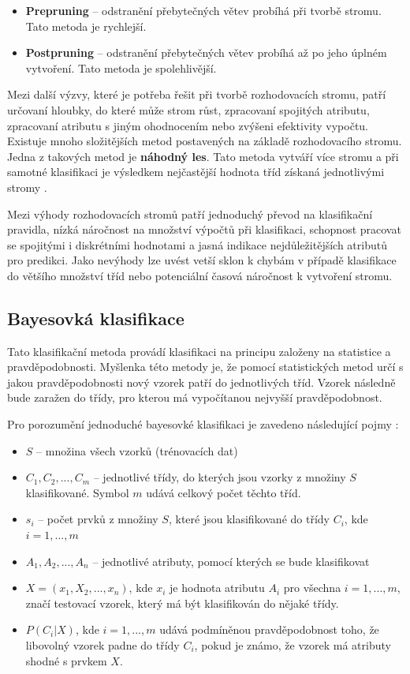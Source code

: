 \begin{itemize}
    \item \textbf{Prepruning} -- odstranění přebytečných větev probíhá při tvorbě stromu. Tato metoda je rychlejší.
    \item \textbf{Postpruning} -- odstranění přebytečných větev probíhá až po jeho úplném vytvoření. Tato metoda je spolehlivější.
\end{itemize}


Mezi další výzvy, které je potřeba řešit při tvorbě rozhodovacích stromu, patří určovaní hloubky, do které může strom růst, zpracovaní spojitých atributu,  zpracovaní atributu s jiným ohodnocením nebo zvýšeni efektivity vypočtu. Existuje mnoho složitějších metod postavených na základě rozhodovacího stromu. Jedna z takových metod je \textbf{náhodný les}. Tato metoda vytváří více stromu a při samotné klasifikaci je výsledkem nejčastější hodnota tříd získaná jednotlivými stromy  \cite{Han}.

Mezi výhody rozhodovacích stromů patří jednoduchý převod na klasifikační pravidla, nízká náročnost na množství výpočtů při klasifikaci, schopnost pracovat se spojitými i diskrétními hodnotami a jasná indikace nejdůležitějších atributů pro predikci. Jako nevýhody lze uvést vetší sklon k chybám v případě klasifikace do většího množství tříd nebo potenciální časová náročnost k vytvoření stromu. \cite{Lior}

\subsection*{Bayesovká klasifikace}
Tato klasifikační metoda provádí klasifikaci na principu založeny na statistice a pravděpodobnosti. Myšlenka této metody je, že pomocí statistických metod určí s jakou  pravděpodobnosti nový vzorek patří do jednotlivých tříd. Vzorek následně bude zaražen do třídy, pro kterou má vypočítanou nejvyšší pravděpodobnost. 

Pro porozumění jednoduché bayesovké klasifikaci je zavedeno následující pojmy \cite{Han}:

\begin{itemize}
    \item $S$ -- množina všech vzorků (trénovacích dat)
    \item $C_1, C_2,...,C_m$ -- jednotlivé třídy, do kterých jsou vzorky z množiny $S$ klasifikované. Symbol $m$ udává celkový počet těchto tříd.
    \item $s_i$ -- počet prvků z množiny $S$, které jsou klasifikované do třídy $C_i$, kde $i=1,...,m$
    \item $A_1, A_2,...,A_n$ -- jednotlivé atributy, pomocí kterých se bude klasifikovat
    \item $X = (x_1,X_2,...,x_n)$, kde $x_i$ je hodnota atributu $A_i$ pro všechna $i=1,...,m$, značí testovací vzorek, který má být klasifikován do nějaké třídy.
    \item $P(C_i|X)$, kde $i=1,...,m$ udává podmíněnou pravděpodobnost toho, že libovolný vzorek padne do třídy $C_i$, pokud je známo, že vzorek má atributy shodné s prvkem $X$.
\end{itemize}

